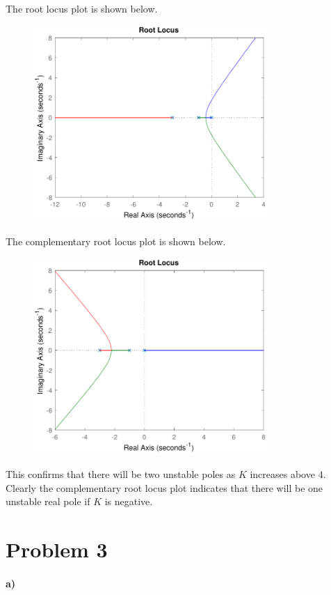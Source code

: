 \documentclass[12pt]{article}
\begin{document}
The root locus plot is shown below.
\begin{figure}[H]
    \begin{center}
        \includegraphics[width=3.5in]{problem2d-reg.pdf}
    \end{center}
\end{figure}
The complementary root locus plot is shown below.
\begin{figure}[H]
    \begin{center}
        \includegraphics[width=3.5in]{problem2d-comp.pdf}
    \end{center}
\end{figure}
This confirms that there will be two unstable poles as \(K\) increases above \(4\). Clearly the complementary
root locus plot indicates that there will be one unstable real pole if \(K\) is negative.

\section*{Problem 3}

\paragraph{a)}
\end{document}
